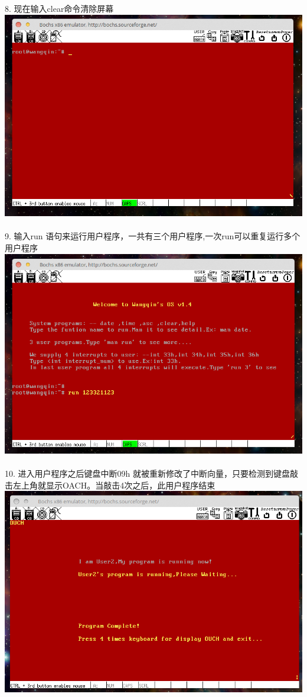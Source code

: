 \documentclass[a4paper]{article}
\begin{document}
{8. 现在输入clear命令清除屏幕
{\center\includegraphics[scale=0.5]{Illustrations/afterclear.png}}\\\\
9. 输入run 语句来运行用户程序，一共有三个用户程序,一次run可以重复运行多个用户程序
{\center\includegraphics[scale=0.5]{Illustrations/runseqs.png}}\\\\
10. 进入用户程序之后键盘中断09h 就被重新修改了中断向量，只要检测到键盘敲击左上角就显示OACH。当敲击4次之后，此用户程序结束
{\center\includegraphics[scale=0.5]{Illustrations/ouch.png}}\\\\
}
\end{document}
